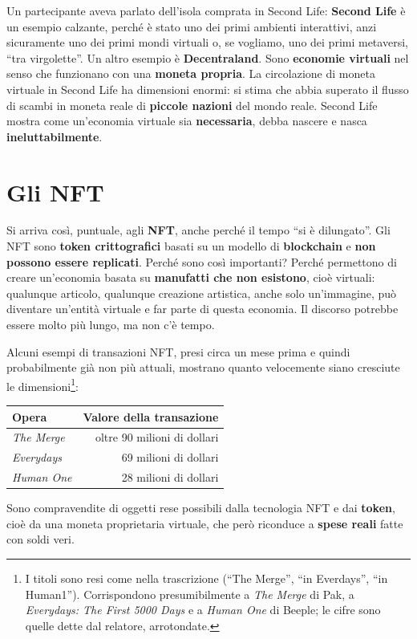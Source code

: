 Un partecipante aveva parlato dell'isola comprata in Second Life: \textbf{Second
Life} è un esempio calzante, perché è stato uno dei primi ambienti interattivi,
anzi sicuramente uno dei primi mondi virtuali o, se vogliamo, uno dei primi
metaversi, ``tra virgolette''. Un altro esempio è \textbf{Decentraland}. Sono
\textbf{economie virtuali} nel senso che funzionano con una \textbf{moneta
propria}. La circolazione di moneta virtuale in Second Life ha dimensioni
enormi: si stima che abbia superato il flusso di scambi in moneta reale di
\textbf{piccole nazioni} del mondo reale. Second Life mostra come un'economia
virtuale sia \textbf{necessaria}, debba nascere e nasca
\textbf{ineluttabilmente}.

\section{Gli NFT}
\label{z8:sec:nft}

Si arriva così, puntuale, agli \textbf{NFT}, anche perché il tempo ``si è
dilungato''. Gli NFT sono \textbf{token crittografici} basati su un modello di
\textbf{blockchain} e \textbf{non possono essere replicati}. Perché sono così
importanti? Perché permettono di creare un'economia basata su
\textbf{manufatti che non esistono}, cioè virtuali: qualunque articolo,
qualunque creazione artistica, anche solo un'immagine, può diventare
un'entità virtuale e far parte di questa economia. Il discorso potrebbe essere
molto più lungo, ma non c'è tempo.

Alcuni esempi di transazioni NFT, presi circa un mese prima e quindi probabilmente
già non più attuali, mostrano quanto velocemente siano cresciute le
dimensioni\footnote{I titoli sono resi come nella trascrizione (``The Merge'',
``in Everdays'', ``in Human1''). Corrispondono presumibilmente a \emph{The
Merge} di Pak, a \emph{Everydays: The First 5000 Days} e a \emph{Human One} di
Beeple; le cifre sono quelle dette dal relatore, arrotondate.}:
\begin{center}
  \begin{tabular}{lr}
    \toprule
    \textbf{Opera} & \textbf{Valore della transazione} \\
    \midrule
    \emph{The Merge} & oltre 90 milioni di dollari \\
    \emph{Everydays} & 69 milioni di dollari \\
    \emph{Human One} & 28 milioni di dollari \\
    \bottomrule
  \end{tabular}
\end{center}
Sono compravendite di oggetti rese possibili dalla tecnologia NFT e dai
\textbf{token}, cioè da una moneta proprietaria virtuale, che però riconduce a
\textbf{spese reali} fatte con soldi veri.

